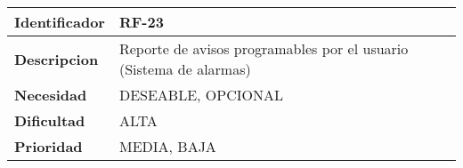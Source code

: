 \begin{center}
    \begin{tabular}{|p{2.6cm}|p{12cm}|}
    \hline
    \textbf{Identificador} & RF-23\\
    \hline
    \textbf{Descripcion} & Reporte de avisos programables por el usuario (Sistema de alarmas)\\
    \hline
    \textbf{Necesidad} & DESEABLE, OPCIONAL\\
    \hline
    \textbf{Dificultad} & ALTA\\
    \hline
    \textbf{Prioridad} & MEDIA, BAJA\\
    \hline
    \end{tabular}
\end{center}
